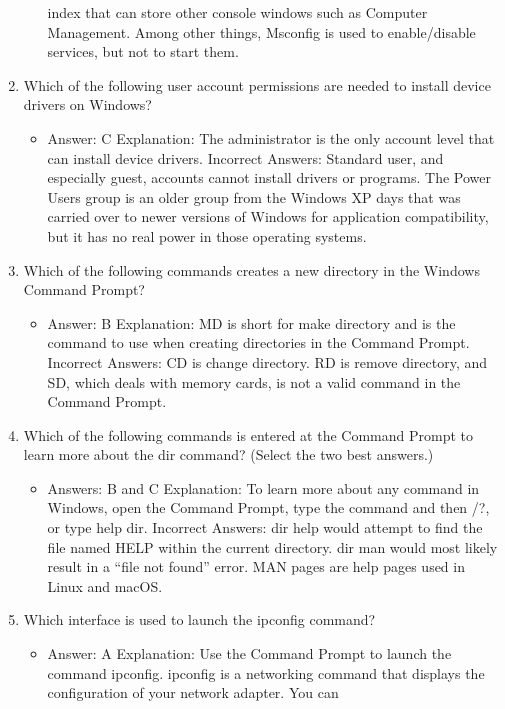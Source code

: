 \documentclass{article}
\begin{document}
\begin{enumerate}
\begin{itemize}
index that can store other console windows such as Computer Management. Among
other things, Msconfig is used to enable/disable services, but not to start them.
     \end{itemize}
     \item Which of the following user account permissions are needed to
install device drivers on Windows?
     \begin{itemize}
         \item Answer: C
Explanation: The administrator is the only account level that can install device drivers.
Incorrect Answers: Standard user, and especially guest, accounts cannot install drivers
or programs. The Power Users group is an older group from the Windows XP days
that was carried over to newer versions of Windows for application compatibility, but it
has no real power in those operating systems.
     \end{itemize}
     \item Which of the following commands creates a new directory in the
Windows Command Prompt?
     \begin{itemize}
         \item  Answer: B
Explanation: MD is short for make directory and is the command to use when creating
directories in the Command Prompt.
Incorrect Answers: CD is change directory. RD is remove directory, and SD, which
deals with memory cards, is not a valid command in the Command Prompt.
     \end{itemize}
     \item Which of the following commands is entered at the Command
Prompt to learn more about the dir command? (Select the two
best answers.)
     \begin{itemize}
         \item Answers: B and C
Explanation: To learn more about any command in Windows, open the Command
Prompt, type the command and then /?, or type help dir.
Incorrect Answers: dir help would attempt to find the file named HELP within the
current directory. dir man would most likely result in a “file not found” error. MAN
pages are help pages used in Linux and macOS.
     \end{itemize}
     \item Which interface is used to launch the ipconfig command?
     \begin{itemize}
         \item Answer: A
Explanation: Use the Command Prompt to launch the command ipconfig. ipconfig is
a networking command that displays the configuration of your network adapter. You can

\end{itemize}
\end{enumerate}
\end{document}

